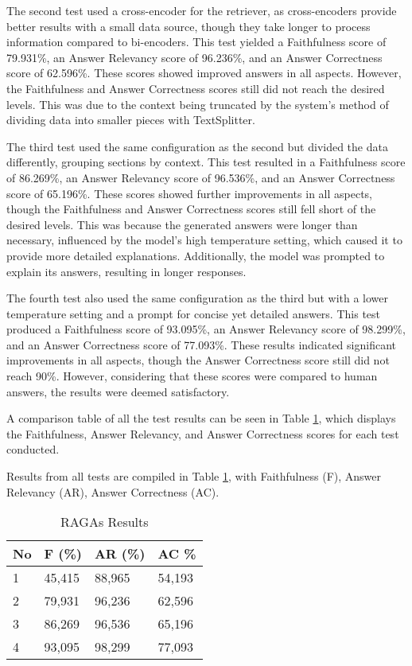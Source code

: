 The second test used a cross-encoder for the retriever, as cross-encoders provide better results with a small data source, though they take longer to process information compared to bi-encoders. This test yielded a Faithfulness score of 79.931\%, an Answer Relevancy score of 96.236\%, and an Answer Correctness score of 62.596\%. These scores showed improved answers in all aspects. However, the Faithfulness and Answer Correctness scores still did not reach the desired levels. This was due to the context being truncated by the system's method of dividing data into smaller pieces with TextSplitter.

The third test used the same configuration as the second but divided the data differently, grouping sections by context. This test resulted in a Faithfulness score of 86.269\%, an Answer Relevancy score of 96.536\%, and an Answer Correctness score of 65.196\%. These scores showed further improvements in all aspects, though the Faithfulness and Answer Correctness scores still fell short of the desired levels. This was because the generated answers were longer than necessary, influenced by the model's high temperature setting, which caused it to provide more detailed explanations. Additionally, the model was prompted to explain its answers, resulting in longer responses.

The fourth test also used the same configuration as the third but with a lower temperature setting and a prompt for concise yet detailed answers. This test produced a Faithfulness score of 93.095\%, an Answer Relevancy score of 98.299\%, and an Answer Correctness score of 77.093\%. These results indicated significant improvements in all aspects, though the Answer Correctness score still did not reach 90\%. However, considering that these scores were compared to human answers, the results were deemed satisfactory.

A comparison table of all the test results can be seen in Table \ref{tab:hasilragas}, which displays the Faithfulness, Answer Relevancy, and Answer Correctness scores for each test conducted.

Results from all tests are compiled in Table \ref{tab:hasilragas}, with Faithfulness (F), Answer Relevancy (AR), Answer Correctness (AC).


\begin{table}[!htbp]
  \caption{RAGAs Results}
  \label{tab:hasilragas}
  \centering
  \begin{tabular}{llll}
    \toprule
    No & F (\%) & AR (\%) & AC {\%} \\
    \midrule
    1& 45,415  & 88,965 & 54,193 \\
    2& 79,931 & 96,236 & 62,596 \\
    3& 86,269 & 96,536 & 65,196 \\
    4& 93,095 & 98,299 & 77,093 \\
    \bottomrule
  \end{tabular}
\end{table}


